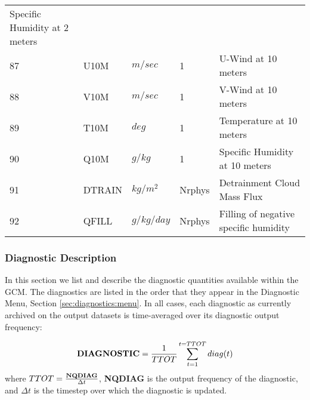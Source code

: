 \begin{tabular}{lllll}
\begin{minipage}[t]{3in}
          {Specific Humidity at 2 meters}
         \end{minipage}\\
87 & U10M    & $m/sec$ &    1
         &\begin{minipage}[t]{3in}
          {U-Wind at 10 meters}
         \end{minipage}\\
88 & V10M    & $m/sec$ &    1
         &\begin{minipage}[t]{3in}
          {V-Wind at 10 meters}
         \end{minipage}\\
89 & T10M    & $deg$ &    1
         &\begin{minipage}[t]{3in}
          {Temperature at 10 meters}
         \end{minipage}\\
90 & Q10M    & $g/kg$ &    1
         &\begin{minipage}[t]{3in}
          {Specific Humidity at 10 meters}
         \end{minipage}\\
91 & DTRAIN  & $kg/m^2$ &    Nrphys
         &\begin{minipage}[t]{3in}
          {Detrainment Cloud Mass Flux}
         \end{minipage}\\
92 & QFILL   & $g/kg/day$ &    Nrphys
         &\begin{minipage}[t]{3in}
          {Filling of negative specific humidity}
         \end{minipage}\\

\end{tabular}
\vspace{1.5in}
\vfill

\newpage

\subsubsection{Diagnostic Description}

In this section we list and describe the diagnostic quantities available within the 
GCM.  The diagnostics are listed in the order that they appear in the 
Diagnostic Menu, Section \ref{sec:diagnostics:menu}.
In all cases, each diagnostic as currently archived on the output datasets
is time-averaged over its diagnostic output frequency:

\[
{\bf DIAGNOSTIC} = {1 \over TTOT} \sum_{t=1}^{t=TTOT} diag(t)
\]
where $TTOT = {{\bf NQDIAG} \over \Delta t}$, {\bf NQDIAG} is the 
output frequency of the diagnostic, and $\Delta t$ is
the timestep over which the diagnostic is updated.  

